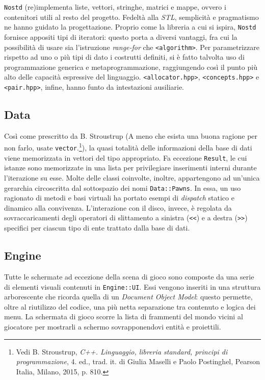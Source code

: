 \documentclass[a4paper]{article}
\begin{document}
\verb!Nostd! (re)implementa liste, vettori, stringhe, matrici e mappe, ovvero i
contenitori utili al resto del progetto. Fedelt\`a alla \emph{STL}, semplicit\`a
e pragmatismo ne hanno guidato la progettazione. Proprio come la libreria a cui
si ispira, \verb!Nostd! fornisce appositi tipi di iteratori: questo porta a
diversi vantaggi, fra cui la possibilit\`a di usare sia l'istruzione
\emph{range-for} che \verb!<algorithm>!. Per parametrizzare rispetto ad uno o
pi\`u tipi di dato i costrutti definiti, si \`e fatto talvolta uso di
programmazione generica e metaprogrammazione, raggiungendo cos\`i il punto pi\`u
alto delle capacit\`a espressive del linguaggio. \verb!<allocator.hpp>!,
\verb!<concepts.hpp>! e \verb!<pair.hpp>!, infine, hanno funto da intestazioni
ausiliarie.

\subsection{Data}

Così come prescritto da B. Stroustrup (\guillemotleft A meno che esista una
buona ragione per non farlo, usate \verb!vector!.\guillemotright\footnote{
\label{note1} Vedi B. Stroustrup, \emph{C++.
Linguaggio, libreria standard, principi di programmazione}, 4. ed., trad. it. di
Giulia Maselli e Paolo Postinghel, Pearson Italia, Milano, 2015, p. 810.}), la
quasi totalità delle informazioni della base di dati viene memorizzata in
vettori del tipo appropriato. Fa eccezione \verb!Result!, le cui istanze sono
memorizzate in una lista per privilegiare inserimenti interni durante
l'iterazione su esse. Molte delle classi coinvolte, inoltre, appartengono ad
un'unica gerarchia circoscritta dal sottospazio dei nomi \verb!Data::Pawns!. In
essa, un uso ragionato di metodi e basi virtuali ha portato esempi di
\emph{dispatch} statico e dinamico alla convivenza. L'interazione con il disco,
invece, \`e regolata da sovraccaricamenti degli operatori di slittamento a
sinistra (\verb!<<!) e a destra (\verb!>>!) specifici per ciascun tipo di ente
trattato dalla base di dati.

\subsection{Engine}

Tutte le schermate ad eccezione della scena di gioco sono composte da una serie
di elementi visuali contenuti in \verb!Engine::UI!. Essi vengono inseriti in una
struttura arborescente che ricorda quella di un \emph{Document Object Model}:
questo permette, oltre al riutilizzo del codice, una più netta separazione tra
contenuto e logica dei menu. La schermata di gioco scorre la lista di frammenti
del mondo vicini al giocatore per mostrarli a schermo sovrapponendovi entit\`a
e proiettili.
\end{document}
